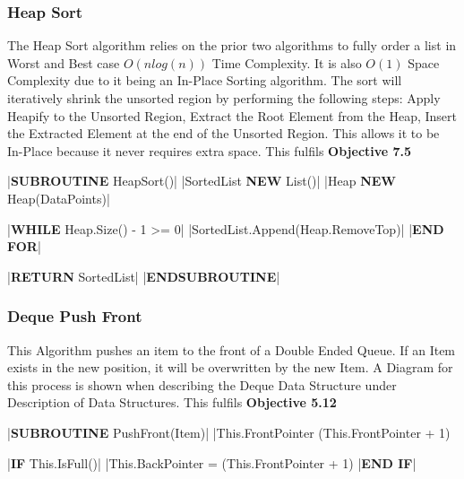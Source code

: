 \begin{flushleft}
            \subsubsection{Heap Sort}
                The Heap Sort algorithm relies on the prior two algorithms to fully order a list in Worst and Best case $O(nlog(n))$ Time Complexity. It 
                is also $O(1)$ Space Complexity due to it being an In-Place Sorting algorithm. The sort will iteratively shrink the unsorted region by 
                performing the following steps: Apply Heapify to the Unsorted Region, Extract the Root Element from the Heap, Insert the Extracted Element 
                at the end of the Unsorted Region. This allows it to be In-Place because it never requires extra space. This fulfils \textbf{Objective 7.5}
                \vspace{0.2cm}

                \begin{pseudocode}
|\textbf{SUBROUTINE} HeapSort()|
    |SortedList \leftarrow \textbf{NEW} List()|
    |Heap \leftarrow \textbf{NEW} Heap(DataPoints)|

    |\textbf{WHILE} Heap.Size() - 1 >= 0|
        |SortedList.Append(Heap.RemoveTop)|
    |\textbf{END FOR}|

    |\textbf{RETURN} SortedList|
|\textbf{ENDSUBROUTINE}|
                \end{pseudocode}

                \vspace{0.5cm}
            \subsubsection{Deque Push Front}
                This Algorithm pushes an item to the front of a Double Ended Queue. If an Item exists in the new position, it will be overwritten by
                the new Item. A Diagram for this process is shown when describing the Deque Data Structure under Description of Data Structures.
                This fulfils \textbf{Objective 5.12}
                \vspace{0.2cm}

                \begin{pseudocode}
|\textbf{SUBROUTINE} PushFront(Item)|
    |This.FrontPointer \leftarrow (This.FrontPointer + 1) %

    |\textbf{IF} This.IsFull()|
        |This.BackPointer = (This.FrontPointer + 1) %
    |\textbf{END IF}|
    

\end{pseudocode}
\end{flushleft}
